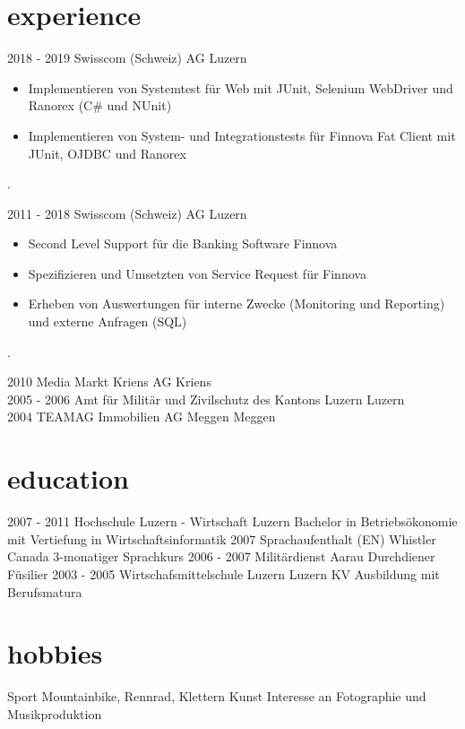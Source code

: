 \documentclass[]{cv-style} %
\begin{document}
\section{experience}
\begin{entrylist}
\entry
{2018 - 2019}
{Swisscom (Schweiz) AG}
{Luzern}
{
\begin{itemize}
  \item Implementieren von Systemtest für Web mit JUnit, Selenium WebDriver und Ranorex (C\# und NUnit)
  \item Implementieren von System- und Integrationstests für Finnova Fat Client mit JUnit, OJDBC und Ranorex
\end{itemize}
.}
\entry
  {2011 - 2018}
  {Swisscom (Schweiz) AG}
  {Luzern}
  {
\begin{itemize}
  \item Second Level Support für die Banking Software Finnova 
  \item Spezifizieren und Umsetzten von Service Request für Finnova
  \item Erheben von Auswertungen für interne Zwecke (Monitoring und Reporting) und externe Anfragen (SQL)
\end{itemize}
.}
\entry
  {2010}
  {Media Markt Kriens AG}
  {Kriens}
  {}\\
\entry
  {2005 - 2006}
  {Amt für Militär und Zivilschutz des Kantons Luzern}
  {Luzern}
  {}\\
\entry
  {2004}
  {TEAMAG Immobilien AG Meggen}
  {Meggen}
  {}
\end{entrylist}
\section{education}
\begin{entrylist}
\entry
{2007 - 2011}
{Hochschule Luzern - Wirtschaft}
{Luzern}
{Bachelor in Betriebsökonomie mit Vertiefung in Wirtschaftsinformatik}
\entry
{2007}
{Sprachaufenthalt (EN)}
{Whistler Canada}
{3-monatiger Sprachkurs}
\entry
{2006 - 2007}
{Militärdienst}
{Aarau}
{Durchdiener Füsilier}
\entry
{2003 - 2005}
{Wirtschafsmittelschule Luzern}
{Luzern}
{KV Ausbildung mit Berufsmatura}
\end{entrylist} 
\section{hobbies}
\begin{entrylist}
\entry
{}
{Sport}
{}
{Mountainbike, Rennrad, Klettern}
\entry
{}
{Kunst}
{}
{Interesse an Fotographie und Musikproduktion}
\end{entrylist}
\end{document}
